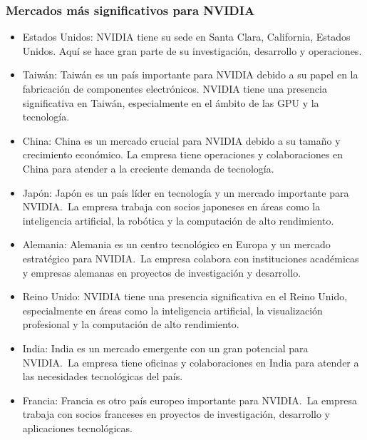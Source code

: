 \documentclass[twocolumn, 12pt]{article}
\begin{document}
\subsubsection*{Mercados más significativos para NVIDIA}

\begin{itemize}
      \item Estados Unidos:
            NVIDIA tiene su sede en Santa Clara, California,
            Estados Unidos. Aquí se hace gran parte de su investigación,
            desarrollo y operaciones.

      \item Taiwán:
            Taiwán es un país importante para NVIDIA debido a su
            papel en la fabricación de componentes electrónicos.
            NVIDIA tiene una presencia significativa en Taiwán,
            especialmente en el ámbito de las GPU y la tecnología.

      \item China:
            China es un mercado crucial para NVIDIA debido a su
            tamaño y crecimiento económico. La empresa tiene
            operaciones y colaboraciones en China para atender a
            la creciente demanda de tecnología.

      \item Japón:
            Japón es un país líder en tecnología y un mercado
            importante para NVIDIA.~La empresa trabaja con socios
            japoneses en áreas como la inteligencia artificial,
            la robótica y la computación de alto rendimiento.

      \item Alemania:
            Alemania es un centro tecnológico en Europa y un
            mercado estratégico para NVIDIA.~La empresa colabora
            con instituciones académicas y empresas alemanas en
            proyectos de investigación y desarrollo.

      \item Reino Unido:
            NVIDIA tiene una presencia significativa en el Reino
            Unido, especialmente en áreas como la inteligencia
            artificial, la visualización profesional y la computación
            de alto rendimiento.

      \item India:
            India es un mercado emergente con un gran potencial
            para NVIDIA.~La empresa tiene oficinas y colaboraciones
            en India para atender a las necesidades tecnológicas del país.

      \item Francia:
            Francia es otro país europeo importante para NVIDIA.~La
            empresa trabaja con socios franceses en proyectos
            de investigación, desarrollo y aplicaciones tecnológicas.

\end{itemize}
\end{document}
